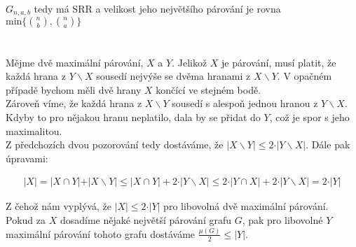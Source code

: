 \documentclass{scrartcl}
\begin{document}
        $G_{n,a,b}$ tedy má SRR a velikost jeho největšího párování je rovna $\text{min}\{\binom{n}{b},\binom{n}{a}\}$
        
    \section{}
        Mějme dvě maximální párování, $X$ a $Y$. Jelikož $X$ je párování, musí platit, že každá hrana z $Y \backslash X$ sousedí nejvýše se dvěma hranami z $X \backslash Y$. V opačném případě bychom měli dvě hrany $X$ končící ve stejném bodě.\\
        
        Zároveň víme, že každá hrana z $X \backslash Y$ sousedí s alespoň jednou hranou z $Y \backslash X$. Kdyby to pro nějakou hranu neplatilo, dala by se přidat do $Y$, což je spor s jeho maximalitou.\\

        Z předchozích dvou pozorování tedy dostáváme, že $\vert X \backslash Y \vert \leq 2 \cdot \vert Y \backslash X \vert$. Dále pak úpravami:

        \begin{align*}
            \vert X \vert = \vert X \cap Y \vert + \vert X \backslash Y \vert \leq \vert X \cap Y \vert + 2 \cdot \vert Y \backslash X \vert \leq 2 \cdot \vert Y \cap X \vert + 2 \cdot \vert Y \backslash X \vert = 2 \cdot \vert Y \vert
        \end{align*}

        Z čehož nám vyplývá, že $\vert X \vert \leq 2 \cdot \vert Y \vert$ pro libovolná dvě maximální párování. Pokud za $X$ dosadíme nějaké největší párování grafu $G$, pak pro libovolné $Y$ maximální párování tohoto grafu dostáváme $\frac{ \mu (G)}{2} \leq \vert Y \vert$.
    
\end{document}

